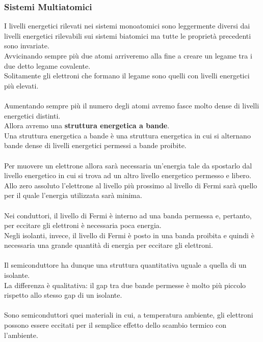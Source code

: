 \documentclass{article}
\numberwithin{equation}{subsection}
\begin{document}
	\subsubsection{Sistemi Multiatomici}
	I livelli energetici rilevati nei sistemi monoatomici sono leggermente diversi dai livelli energetici rilevabili sui sistemi biatomici ma tutte le proprietà precedenti sono invariate. \\
	Avvicinando sempre più due atomi arriveremo alla fine a creare un legame tra i due detto legame covalente. \\
	Solitamente gli elettroni che formano il legame sono quelli con livelli energetici più elevati.\\\\
	Aumentando sempre più il numero degli atomi avremo fasce molto dense di livelli energetici distinti. \\
	Allora avremo una \textbf{struttura energetica a bande}. \\
	Una struttura energetica a bande è una struttura energetica in cui si alternano bande dense di livelli energetici permessi a bande proibite.\\\\
	Per muovere un elettrone allora sarà necessaria un’energia tale da spostarlo dal livello energetico in cui si trova ad un altro livello energetico permesso e libero. \\
	Allo zero assoluto l’elettrone al livello più prossimo al livello di Fermi sarà quello per il quale l’energia utilizzata sarà minima.\\\\
	Nei conduttori, il livello di Fermi è interno ad una banda permessa e, pertanto, per eccitare gli elettroni è necessaria poca energia.\\ 
	Negli isolanti, invece, il livello di Fermi è posto in una banda proibita e quindi è necessaria una grande quantità di energia per eccitare gli elettroni.\\\\
	Il semiconduttore ha dunque una struttura quantitativa uguale a quella di un isolante. \\
	La differenza è qualitativa: il gap tra due bande permesse è molto più piccolo rispetto allo stesso gap di un isolante.\\\\
	Sono semiconduttori quei materiali in cui, a temperatura ambiente, gli elettroni possono essere eccitati per il semplice effetto dello scambio termico con l’ambiente. \\
\end{document}
